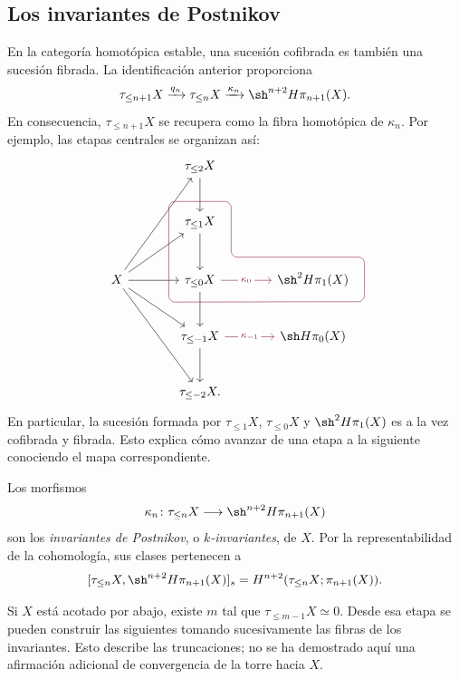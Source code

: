 \subsection{Los invariantes de Postnikov}
En la categoría homotópica estable, una sucesión cofibrada es también una sucesión fibrada. La identificación anterior proporciona
\[
\tau_{\leq n+1}X\xrightarrow{q_n}\tau_{\leq n}X
\xrightarrow{\kappa_n}\sh^{n+2}H\pi_{n+1}(X).
\]
En consecuencia, $\tau_{\leq n+1}X$ se recupera como la fibra homotópica de $\kappa_n$. Por ejemplo, las etapas centrales se organizan así:
\[
\begin{tikzcd}[column sep=large,row sep=large,
execute at end picture={
\draw[rojoDiagramaCIMAT,rounded corners=5pt]
([xshift=-8pt,yshift=8pt]T1.north west)--
([xshift=8pt,yshift=8pt]T1.north east)--
([xshift=8pt,yshift=8pt]T1.north east |- K0.north west)--
([xshift=8pt,yshift=8pt]K0.north east)--
([xshift=8pt,yshift=-8pt]K0.south east)--
([xshift=-8pt,yshift=-8pt]T0.south west)--cycle;
}]
&\tau_{\leq2}X\arrow[d]&\\
&|[alias=T1]|\tau_{\leq1}X\arrow[d]&\\
X\arrow[uur]\arrow[ur]\arrow[r]\arrow[dr]\arrow[ddr]
&|[alias=T0]|\tau_{\leq0}X\arrow[d]\arrow[r,"\kappa_0" {description},rojoDiagramaCIMAT]
&|[alias=K0]|\sh^2H\pi_1(X)\\
&\tau_{\leq-1}X\arrow[d]\arrow[r,"\kappa_{-1}" {description},rojoDiagramaCIMAT]
&\sh H\pi_0(X)\\
&\tau_{\leq-2}X.&
\end{tikzcd}
\]
En particular, la sucesión formada por $\tau_{\leq1}X$, $\tau_{\leq0}X$ y $\sh^2H\pi_1(X)$ es a la vez cofibrada y fibrada. Esto explica cómo avanzar de una etapa a la siguiente conociendo el mapa correspondiente.

\begin{defi}
Los morfismos
\[
\kappa_n\colon\tau_{\leq n}X\longrightarrow\sh^{n+2}H\pi_{n+1}(X)
\]
son los \emph{invariantes de Postnikov}, o \emph{$k$-invariantes}, de $X$. Por la representabilidad de la cohomología, sus clases pertenecen a
\[
[\tau_{\leq n}X,\sh^{n+2}H\pi_{n+1}(X)]_s
=H^{n+2}(\tau_{\leq n}X;\pi_{n+1}(X)).
\]
\end{defi}

Si $X$ está acotado por abajo, existe $m$ tal que $\tau_{\leq m-1}X\simeq0$. Desde esa etapa se pueden construir las siguientes tomando sucesivamente las fibras de los invariantes. Esto describe las truncaciones; no se ha demostrado aquí una afirmación adicional de convergencia de la torre hacia $X$.

